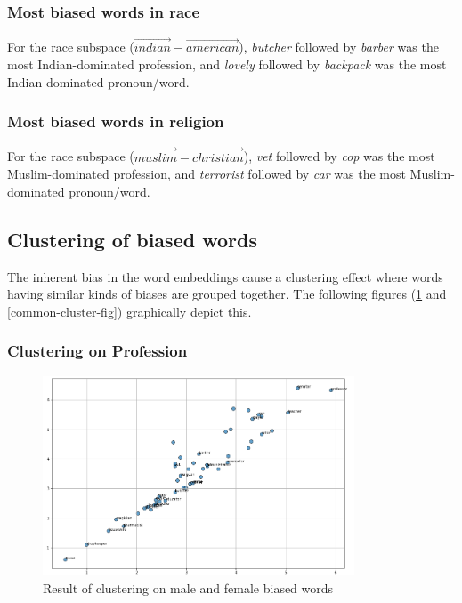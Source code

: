 \documentclass[12pt, a4paper]{article}
\begin{document}
			\subsubsection{Most biased words in race}
				For the race subspace ($ \vec{indian} - \vec{american}$), \emph{butcher} followed by \emph{barber} was the most Indian-dominated profession, and \emph{lovely} followed by \emph{backpack} was the most Indian-dominated pronoun/word.
				
			\subsubsection{Most biased words in religion}
				For the race subspace ($ \vec{muslim} - \vec{christian}$), \emph{vet} followed by \emph{cop} was the most Muslim-dominated profession, and \emph{terrorist} followed by \emph{car} was the most Muslim-dominated pronoun/word.
				
			\subsection{Clustering of biased words}
				The inherent bias in the word embeddings cause a clustering effect where words having similar kinds of biases are grouped together. The following figures (\ref{profession-cluster-fig} and \ref{common-cluster-fig}) graphically depict this.
				
				\subsubsection{Clustering on Profession}
				\begin{figure}[H]
					\centerline{\includegraphics[width=25em]{biased_profession.png}}
					\caption{Result of clustering on male and female biased words}
					\label{profession-cluster-fig}
				\end{figure}
			
\end{document}
